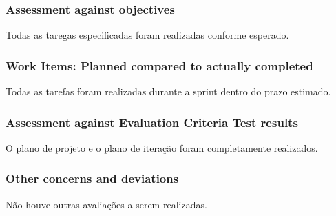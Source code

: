 \subsubsection*{Assessment against objectives}
Todas as taregas especificadas foram realizadas conforme esperado.

\subsubsection*{Work Items: Planned compared to actually completed}
Todas as tarefas foram realizadas durante a sprint dentro do prazo estimado.

\subsubsection*{Assessment against Evaluation Criteria Test results}
O plano de projeto e o plano de iteração foram completamente realizados.

\subsubsection*{Other concerns and deviations}
Não houve outras avaliações a serem realizadas.

